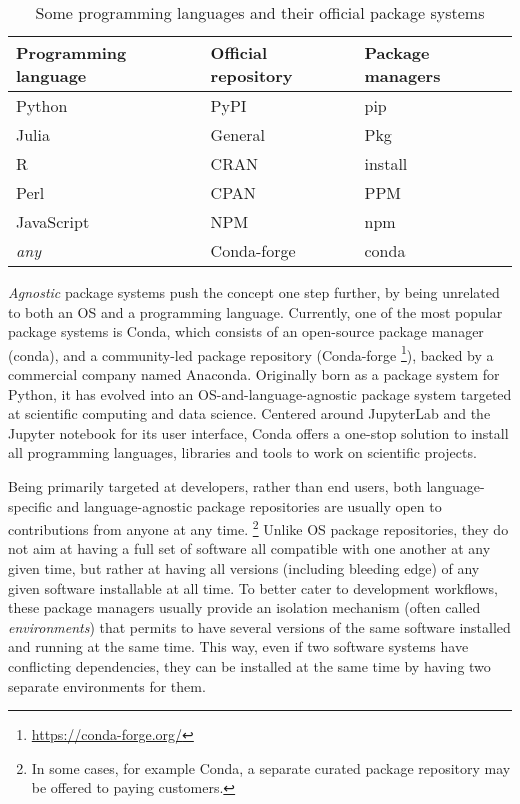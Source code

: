 \documentclass{deliverablereport}
\begin{document}
\begin{table}
  \centering
  \begin{tabular}{l | l | l}
    Programming language & Official repository & Package managers\\
    \hline
    Python & PyPI & pip\\
    Julia & General & Pkg\\
    R & CRAN & install\\
    Perl & CPAN & PPM\\
    JavaScript & NPM & npm \\
    \emph{any} & Conda-forge & conda
  \end{tabular}
  \caption{Some programming languages and their official package systems}
  \label{tab:pkg-lang}
\end{table}

\emph{Agnostic} package systems push the concept one step further, by
being unrelated to both an OS and a programming language. %
Currently, one of the most popular package systems is Conda, which
consists of an open-source package manager (conda), and a
community-led package repository (Conda-forge%
\footnote{\url{https://conda-forge.org/}}), %
backed by a commercial company named Anaconda. %
Originally born as a package system for Python, it has evolved into an
OS-and-language-agnostic package system targeted at scientific
computing and data science. %
Centered around JupyterLab and the Jupyter notebook for its user
interface, Conda offers a one-stop solution to install all
programming languages, libraries and tools to work on scientific
projects.

Being primarily targeted at developers, rather than end users, both
language-specific and language-agnostic package repositories are
usually open to contributions from anyone at any time.%
\footnote{In some cases, for example Conda, a separate curated package
  repository may be offered to paying customers.} %
Unlike OS package repositories, they do not aim at having a full set
of software all compatible with one another at any given time, but
rather at having all versions (including bleeding edge) of any given
software installable at all time. %
To better cater to development workflows, these package managers
usually provide an isolation mechanism (often called
\emph{environments}) that permits to have several versions of the same
software installed and running at the same time. %
This way, even if two software systems have conflicting dependencies, they can
be installed at the same time by having two separate environments for
them.
\end{document}
